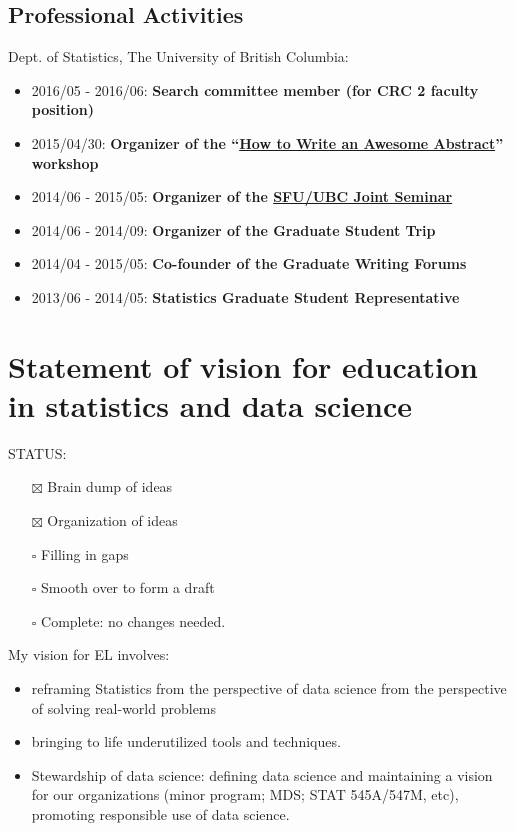 \documentclass[]{article}
\providecommand{\tightlist}{%
  \setlength{\itemsep}{0pt}\setlength{\parskip}{0pt}}
\begin{document}
\hypertarget{professional-activities}{%
\subsection{Professional Activities}\label{professional-activities}}

Dept. of Statistics, The University of British Columbia:

\begin{itemize}
\tightlist
\item
  2016/05 - 2016/06: \textbf{Search committee member (for CRC 2 faculty position)}
\item
  2015/04/30: \textbf{Organizer of the ``\href{http://stat.ubc.ca/~vincen.coia/abstractworkshop.html}{How to Write an Awesome Abstract}'' workshop}
\item
  2014/06 - 2015/05: \textbf{Organizer of the \href{http://stat.ubc.ca/~vincen.coia/seminar.html}{SFU/UBC Joint Seminar}}
\item
  2014/06 - 2014/09: \textbf{Organizer of the Graduate Student Trip}
\item
  2014/04 - 2015/05: \textbf{Co-founder of the Graduate Writing Forums}
\item
  2013/06 - 2014/05: \textbf{Statistics Graduate Student Representative}
\end{itemize}

\hypertarget{statement-of-vision-for-education-in-statistics-and-data-science}{%
\section{Statement of vision for education in statistics and data science}\label{statement-of-vision-for-education-in-statistics-and-data-science}}

STATUS:

\begin{itemize}
\tightlist
\item[$\boxtimes$]
  Brain dump of ideas
\item[$\boxtimes$]
  Organization of ideas
\item[$\square$]
  Filling in gaps
\item[$\square$]
  Smooth over to form a draft
\item[$\square$]
  Complete: no changes needed.
\end{itemize}

My vision for EL involves:

\begin{itemize}
\tightlist
\item
  reframing Statistics from the perspective of data science from the perspective of solving real-world problems
\item
  bringing to life underutilized tools and techniques.
\item
  Stewardship of data science: defining data science and maintaining a vision for our organizations (minor program; MDS; STAT 545A/547M, etc), promoting responsible use of data science.
\end{itemize}
\end{document}
